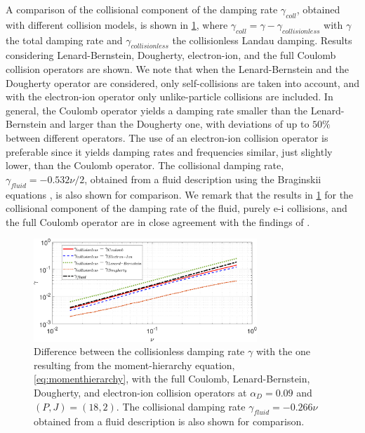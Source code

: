 {
A comparison of the collisional component of the damping rate $\gamma_{coll}$, obtained with different collision models, is shown in \cref{fig:coulLBcomp},  where $\gamma_{coll} = \gamma - \gamma_{collisionless}$ with $\gamma$ the total damping rate and $\gamma_{collisionless}$ the collisionless Landau damping.
%
Results considering Lenard-Bernstein, Dougherty, electron-ion, and the full Coulomb collision operators are shown.
}
%
{We note that when the Lenard-Bernstein and the Dougherty operator are considered, only self-collisions are taken into account, and with the electron-ion operator only unlike-particle collisions are included.}
%
In general, the Coulomb operator yields a damping rate smaller than the Lenard-Bernstein and larger than the Dougherty one, with deviations of up to $50\%$ between different operators.
%
The use of an electron-ion collision operator is preferable since it yields  damping rates and frequencies similar, just slightly lower, than the Coulomb operator.
%
{The collisional damping rate, $\gamma_{fluid}=-0.532\nu/2$, obtained from a fluid description using the Braginskii equations \citep{Banks2017}, is also shown for comparison.}
%
{We remark that the results in \cref{fig:coulLBcomp} for the collisional component of the damping rate of the fluid, purely e-i collisions, and the full Coulomb operator are in close agreement with the findings of \citet{Banks2017}.}


\begin{figure}
    \centering
    \includegraphics[width=0.75\textwidth]{images/alphaD0_09_gammaomegaPeak_pmax18_jmax2-eps-converted-to.pdf}
    \caption{Difference between the collisionless damping rate $\gamma$ with the one resulting from the moment-hierarchy equation, \cref{eq:momenthierarchy}, with the full Coulomb, Lenard-Bernstein, Dougherty, and electron-ion collision operators at $\alpha_D=0.09$ and $(P,J)=(18,2)$. {The collisional damping rate $\gamma_{fluid}=-0.266 \nu$ obtained from a fluid description is also shown for comparison.}}
    \label{fig:coulLBcomp}
\end{figure}

